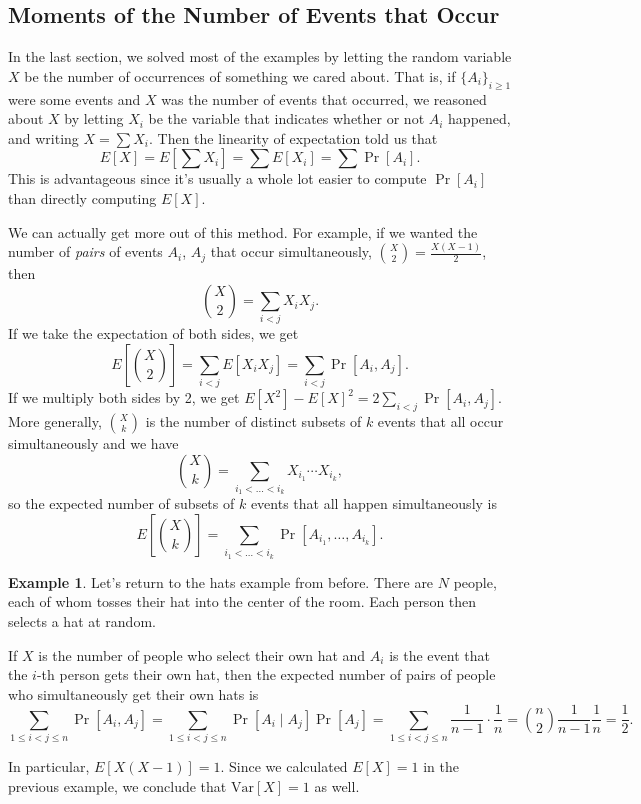 \documentclass[12pt]{article}
\theoremstyle{plain}
\theoremstyle{definition}
\newtheorem{example}[theorem]{Example}
\theoremstyle{remark}
\newcommand{\Var}{\ensuremath{\textrm{Var}}}
\begin{document}
\subsection{Moments of the Number of Events that Occur}
In the last section, we solved most of the examples by letting the random variable $X$ be the number of occurrences of something we cared about.
That is, if $\{A_i\}_{i\geq 1}$ were some events and $X$ was the number of events that occurred, we reasoned about $X$ by letting $X_i$ be the variable that indicates whether or not $A_i$ happened, and writing $X = \sum X_i$.
Then the linearity of expectation told us that
\[
    E[X] = E\left[ \sum X_i\right] = \sum E[X_i] = \sum \Pr[A_i].
\]
This is advantageous since it's usually a whole lot easier to compute $\Pr[A_i]$ than directly computing $E[X]$.

We can actually get more out of this method.
For example, if we wanted the number of \emph{pairs} of events $A_i$, $A_j$ that occur simultaneously, $\binom{X}{2} = \frac{X(X-1)}{2}$, then
\[
    \binom{X}{2} = \sum_{i<j}X_iX_j.
\]
If we take the expectation of both sides, we get
\begin{equation}\label{pairs}
    E\left[\binom{X}{2}\right] = \sum_{i<j}E[X_iX_j] = \sum_{i<j}\Pr[A_i, A_j].
\end{equation}
If we multiply both sides by 2, we get $E[X^2]-E[X]^2 = 2\sum_{i<j}\Pr[A_i, A_j]$.
More generally, $\binom{X}{k}$ is the number of distinct subsets of $k$ events that all occur simultaneously and we have
\[
    \binom{X}{k} = \sum_{i_1 < \ldots < i_k}X_{i_1}\cdots X_{i_k},
\]
so the expected number of subsets of $k$ events that all happen simultaneously is
\[
E\left[\binom{X}{k}\right] = \sum_{i_1 < \ldots < i_k}\Pr[A_{i_1}, \ldots, A_{i_k}].
\]

\begin{example}
    Let's return to the hats example from before.
    There are $N$ people, each of whom tosses their hat into the center of the room.
    Each person then selects a hat at random.

    If $X$ is the number of people who select their own hat and $A_i$ is the event that the $i$-th person gets their own hat, then the expected number of pairs of people who simultaneously get their own hats is
    \[
        \sum_{1 \leq i<j\leq n}\Pr[A_i, A_j] = \sum_{1\leq i<j\leq n}\Pr[A_i \mid A_j]\Pr[A_j] = \sum_{1\leq i<j\leq n}\frac{1}{n-1}\cdot\frac{1}{n} = \binom{n}{2}\frac{1}{n-1}\frac{1}{n} = \frac{1}{2}.
    \]

    In particular, $E[X(X-1)] = 1$.
    Since we calculated $E[X] = 1$ in the previous example, we conclude that $\Var[X] = 1$ as well.
\end{example}
\end{document}
